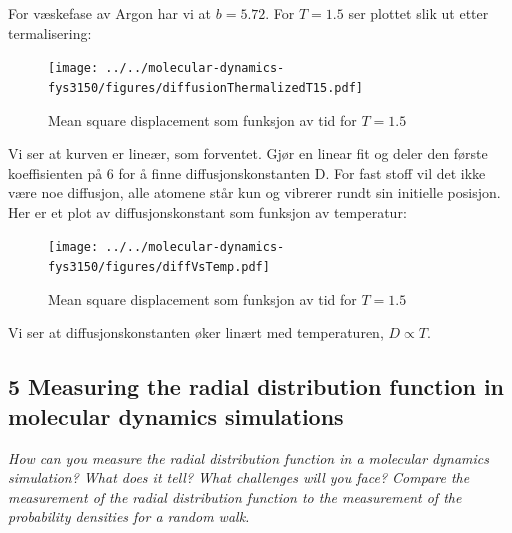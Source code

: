 \documentclass[english, a4paper]{article}
\begin{document}
\noindent
For væskefase av Argon har vi at $b=5.72$. For $T=1.5$ ser plottet slik ut etter termalisering:
\begin{figure}[H]
  \begin{center}
  \texttt{[image: ../../molecular-dynamics-fys3150/figures/diffusionThermalizedT15.pdf]}
  \caption{Mean square displacement som funksjon av tid for $T = 1.5$}
  \label{fig:fig5}
  \end{center}
\end{figure}
Vi ser at kurven er lineær, som forventet. Gjør en linear fit og deler den første koeffisienten på 6
for å finne diffusjonskonstanten D. For fast stoff vil det ikke være noe diffusjon, alle 
atomene står kun og vibrerer rundt sin initielle posisjon. 
Her er et plot av diffusjonskonstant som funksjon av temperatur:
\begin{figure}[H]
  \begin{center}
  \texttt{[image: ../../molecular-dynamics-fys3150/figures/diffVsTemp.pdf]}
  \caption{Mean square displacement som funksjon av tid for $T = 1.5$}
  \label{fig:fig5}
  \end{center}
\end{figure}
Vi ser at diffusjonskonstanten øker linært med temperaturen, $D \propto T$. 

\subsection{5 Measuring the radial distribution function in molecular dynamics simulations}
\textit{How can you measure the radial distribution function in a molecular dynamics simulation?
What does it tell? What challenges will you face? Compare the measurement of the radial distribution
function to the measurement of the probability densities for a random walk.}\\
\end{document}

